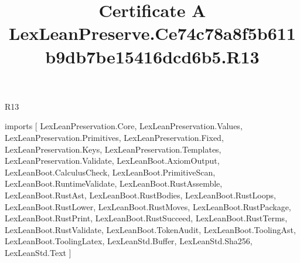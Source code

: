 \begin{lexlean}{R13}
\title{Certificate A LexLeanPreserve.Ce74c78a8f5b611b9db7be15416dcd6b5.R13}
\begin{coremodule}
imports [
  LexLeanPreservation.Core,
  LexLeanPreservation.Values,
  LexLeanPreservation.Primitives,
  LexLeanPreservation.Fixed,
  LexLeanPreservation.Keys,
  LexLeanPreservation.Templates,
  LexLeanPreservation.Validate,
  LexLeanBoot.AxiomOutput,
  LexLeanBoot.CalculusCheck,
  LexLeanBoot.PrimitiveScan,
  LexLeanBoot.RuntimeValidate,
  LexLeanBoot.RustAssemble,
  LexLeanBoot.RustAst,
  LexLeanBoot.RustBodies,
  LexLeanBoot.RustLoops,
  LexLeanBoot.RustLower,
  LexLeanBoot.RustMoves,
  LexLeanBoot.RustPackage,
  LexLeanBoot.RustPrint,
  LexLeanBoot.RustSucceed,
  LexLeanBoot.RustTerms,
  LexLeanBoot.RustValidate,
  LexLeanBoot.TokenAudit,
  LexLeanBoot.ToolingAst,
  LexLeanBoot.ToolingLatex,
  LexLeanStd.Buffer,
  LexLeanStd.Sha256,
  LexLeanStd.Text
]


\end{coremodule}
\end{lexlean}
